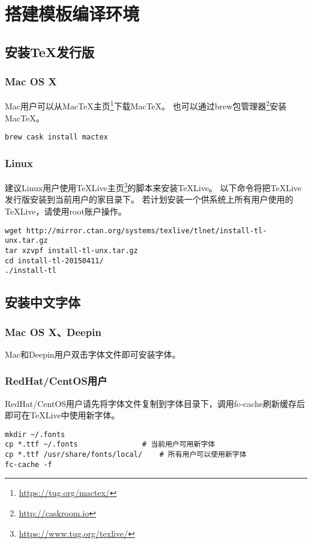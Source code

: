 \chapter{搭建模板编译环境}

\section{安装TeX发行版}

\subsection{Mac OS X}

Mac用户可以从MacTeX主页\footnote{\url{https://tug.org/mactex/}}下载MacTeX。
也可以通过brew包管理器\footnote{\url{http://caskroom.io}}安装MacTeX。

\begin{lstlisting}[basicstyle=\small\ttfamily, numbers=none]
brew cask install mactex
\end{lstlisting}

\subsection{Linux}

建议Linux用户使用TeXLive主页\footnote{\url{https://www.tug.org/texlive/}}的脚本来安装TeXLive。
以下命令将把TeXLive发行版安装到当前用户的家目录下。
若计划安装一个供系统上所有用户使用的TeXLive，请使用root账户操作。

\begin{lstlisting}[basicstyle=\small\ttfamily, numbers=none]
wget http://mirror.ctan.org/systems/texlive/tlnet/install-tl-unx.tar.gz
tar xzvpf install-tl-unx.tar.gz
cd install-tl-20150411/
./install-tl
\end{lstlisting}

\section{安装中文字体}

\subsection{Mac OS X、Deepin}

Mac和Deepin用户双击字体文件即可安装字体。

\subsection{RedHat/CentOS用户}

RedHat/CentOS用户请先将字体文件复制到字体目录下，调用fc-cache刷新缓存后即可在TeXLive中使用新字体。

\begin{lstlisting}[basicstyle=\small\ttfamily, numbers=none]
mkdir ~/.fonts
cp *.ttf ~/.fonts				# 当前用户可用新字体
cp *.ttf /usr/share/fonts/local/	# 所有用户可以使用新字体
fc-cache -f
\end{lstlisting}
